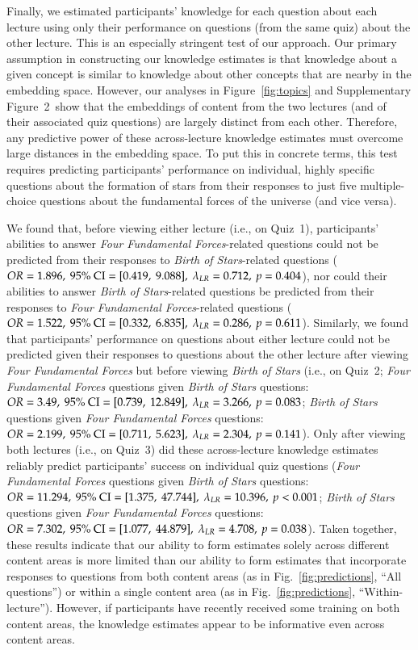 \documentclass[10pt]{article}
\newcommand{\topicWeights}{2}
\begin{document}
Finally, we estimated participants' knowledge for each question about each
lecture using only their performance on questions (from the same quiz) about the
other lecture. This is an especially stringent test of our approach.
Our primary assumption in constructing our knowledge estimates is that knowledge
about a given concept is similar to knowledge about other concepts that are
nearby in the embedding space. However, our analyses in Figure~\ref{fig:topics}
and Supplementary Figure~\topicWeights\ show that the embeddings of content from
the two lectures (and of their associated quiz questions) are largely distinct
from each other. Therefore, any predictive power of these across-lecture
knowledge estimates must overcome large distances in the embedding space. To put
this in concrete terms, this test requires predicting participants' performance
on individual, highly specific questions about the formation of stars from their
responses to just five multiple-choice questions about the fundamental forces of
the universe (and vice versa).

We found that, before viewing either lecture (i.e., on Quiz~1), participants'
abilities to answer \textit{Four Fundamental Forces}-related questions could
not be predicted from their responses to \textit{Birth of Stars}-related
questions ($OR = 1.896,\ 95\%\ \textnormal{CI} = [0.419,\ 9.088],\ \lambda_{LR}
= 0.712,\ p = 0.404$), nor could their abilities to answer \textit{Birth of
Stars}-related questions be predicted from their responses to \textit{Four
Fundamental Forces}-related questions ($OR = 1.522,\ 95\%\ \textnormal{CI} =
[0.332,\ 6.835],\ \lambda_{LR} = 0.286,\ p = 0.611$). Similarly, we found that
participants' performance on questions about either lecture could not be
predicted given their responses to questions about the other lecture after
viewing \textit{Four Fundamental Forces} but before viewing \textit{Birth of
Stars} (i.e., on Quiz~2; \textit{Four Fundamental Forces} questions given
\textit{Birth of Stars} questions: $OR = 3.49,\ 95\%\ \textnormal{CI} =
[0.739,\ 12.849],\ \lambda_{LR} = 3.266,\ p = 0.083$; \textit{Birth of Stars}
questions given \textit{Four Fundamental Forces} questions: $OR = 2.199,\ 95\%\
\textnormal{CI} = [0.711,\ 5.623],\ \lambda_{LR} = 2.304,\ p = 0.141$). Only
after viewing both lectures (i.e., on Quiz~3) did these across-lecture
knowledge estimates reliably predict participants' success on individual quiz
questions (\textit{Four Fundamental Forces} questions given \textit{Birth of
Stars} questions: $OR = 11.294,\ 95\%\ \textnormal{CI} = [1.375,\ 47.744],\
\lambda_{LR} = 10.396,\ p < 0.001$; \textit{Birth of Stars} questions given
\textit{Four Fundamental Forces} questions: $OR = 7.302,\ 95\%\ \textnormal{CI}
= [1.077,\ 44.879],\ \lambda_{LR} = 4.708,\ p = 0.038$). Taken together, these
results indicate that our ability to form estimates solely across different
content areas is more limited than our ability to form estimates that
incorporate responses to questions from both content areas (as in
Fig.~\ref{fig:predictions}, ``All questions'') or within a single content area
(as in Fig.~\ref{fig:predictions}, ``Within-lecture''). However, if participants
have recently received some training on both content areas, the knowledge
estimates appear to be informative even across content areas.
\end{document}
